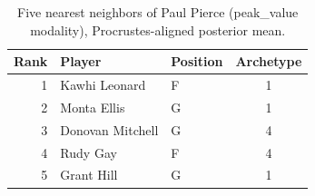 \begin{table}[htbp]
  \centering\small
  \begin{tabular}{rllc}
    \toprule
    Rank & Player & Position & Archetype \\
    \midrule
    1 & Kawhi Leonard & F & 1 \\
    2 & Monta Ellis & G & 1 \\
    3 & Donovan Mitchell & G & 4 \\
    4 & Rudy Gay & F & 4 \\
    5 & Grant Hill & G & 1 \\
    \bottomrule
  \end{tabular}
  \caption{Five nearest neighbors of Paul Pierce (peak_value modality), Procrustes-aligned posterior mean.}
  \label{tab:Paul_Pierce_neighbors_peak_value}
\end{table}

